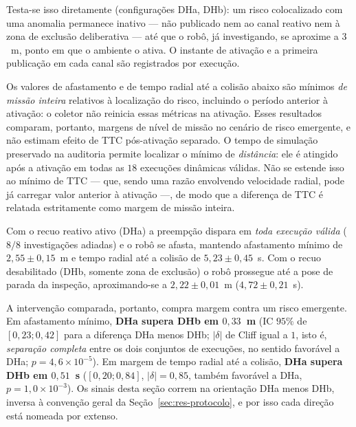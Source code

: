 Testa-se isso diretamente (configurações DHa, DHb): um risco colocalizado com uma
anomalia permanece inativo --- não publicado nem ao canal reativo nem à zona de
exclusão deliberativa --- até que o robô, já investigando, se aproxime a $3$~m, ponto
em que o ambiente o ativa. O instante de ativação e a primeira publicação em cada
canal são registrados por execução.

Os valores de afastamento e de tempo radial até a colisão abaixo são mínimos
\emph{de missão inteira} relativos à localização do risco, incluindo o período
anterior à ativação: o coletor não reinicia essas métricas na ativação. Esses
resultados comparam, portanto, margens de nível de missão no cenário de risco
emergente, e não estimam efeito de TTC pós-ativação separado. O tempo de simulação
preservado na auditoria permite localizar o mínimo de \emph{distância}: ele é
atingido após a ativação em todas as $18$ execuções dinâmicas válidas. Não se estende
isso ao mínimo de TTC --- que, sendo uma razão envolvendo velocidade radial, pode já
carregar valor anterior à ativação ---, de modo que a diferença de TTC é relatada
estritamente como margem de missão inteira.

Com o recuo reativo ativo (DHa) a preempção dispara em \emph{toda execução válida}
($8/8$ investigações adiadas) e o robô se afasta, mantendo afastamento mínimo de
$2{,}55\pm0{,}15$~m e tempo radial até a colisão de $5{,}23\pm0{,}45$~s. Com o recuo
desabilitado (DHb, somente zona de exclusão) o robô prossegue até a pose de parada da
inspeção, aproximando-se a $2{,}22\pm0{,}01$~m ($4{,}72\pm0{,}21$~s).

A intervenção comparada, portanto, compra margem contra um risco emergente. Em
afastamento mínimo, \textbf{DHa supera DHb em $0{,}33$~m} (IC $95\%$ de
$[0{,}23;0{,}42]$ para a diferença DHa menos DHb; $|\delta|$ de Cliff igual a $1$, isto
é, \emph{separação completa} entre os dois conjuntos de execuções, no sentido favorável
a DHa; $p=4{,}6\times10^{-5}$). Em margem de tempo radial até a colisão,
\textbf{DHa supera DHb em $0{,}51$~s} ($[0{,}20;0{,}84]$, $|\delta|=0{,}85$, também
favorável a DHa, $p=1{,}0\times10^{-3}$). Os sinais desta seção correm na orientação
DHa menos DHb, inversa à convenção geral da Seção~\ref{sec:res-protocolo}, e por isso
cada direção está nomeada por extenso.

